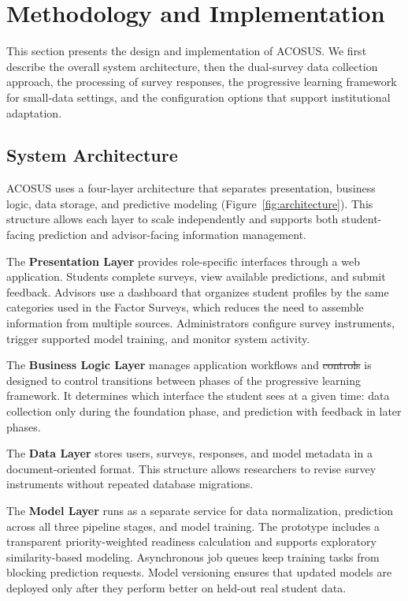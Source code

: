 \documentclass[letterpaper,11pt]{article}
\newcommand{\DIFdel}[1]{%
  \begingroup\setlength{\fboxsep}{0.5pt}%
  \colorbox{diffdelbg}{\textcolor{diffdeltext}{\sout{#1}}}%
  \endgroup}
\newcommand{\DIFadd}[1]{%
  \begingroup\setlength{\fboxsep}{0.5pt}%
  \colorbox{diffaddbg}{\textcolor{diffaddtext}{#1}}%
  \endgroup}
\begin{document}
\section{Methodology and Implementation}\label{sec:methodology}

This section presents the design and implementation of ACOSUS. We first describe the overall system architecture, then the dual-survey data collection approach, the processing of survey responses, the progressive learning framework for small-data settings, and the configuration options that support institutional adaptation.

\subsection{System Architecture}\label{subsec:sysarch}

ACOSUS uses a four-layer architecture that separates presentation, business logic, data storage, and predictive modeling (Figure~\ref{fig:architecture}). This structure allows each layer to scale independently and supports both student-facing prediction and advisor-facing information management.

The \textbf{Presentation Layer} provides role-specific interfaces through a web application. Students complete surveys, view \DIFadd{available} predictions, and submit feedback. Advisors use a dashboard that organizes student profiles by the same categories used in the Factor Surveys, which reduces the need to assemble information from multiple sources. Administrators configure survey instruments, trigger \DIFadd{supported} model training, and monitor system activity.

The \textbf{Business Logic Layer} manages application workflows and \DIFdel{controls} \DIFadd{is} \DIFadd{designed} \DIFadd{to} \DIFadd{control} transitions between phases of the progressive learning framework. It determines which interface the student sees at a given time: data collection only during the foundation phase, and prediction with feedback in later phases.

The \textbf{Data Layer} stores users, surveys, responses, and model metadata in a document-oriented format. This structure allows researchers to revise survey instruments without repeated database migrations.

The \textbf{Model Layer} runs as a separate service for data normalization, prediction across all three pipeline stages, and model training. \DIFadd{The} \DIFadd{prototype} \DIFadd{includes} \DIFadd{a} \DIFadd{transparent} \DIFadd{priority-weighted} \DIFadd{readiness} \DIFadd{calculation} \DIFadd{and} \DIFadd{supports} \DIFadd{exploratory} \DIFadd{similarity-based} \DIFadd{modeling.} Asynchronous job queues keep training tasks from blocking prediction requests. Model versioning ensures that updated models are deployed only after they perform better on held-out real student data.
\end{document}
